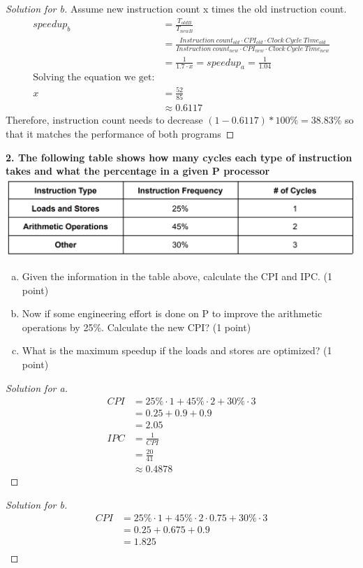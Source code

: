\documentclass[12pt]{article}
\begin{document}
\begin{proof}[Solution for b]
	Assume new instruction count x times the old instruction count.
	\begin{align*}
		speedup_b&=\frac{T_{oldB}}{T_{newB}}\\
		&=\frac{Instruction\ count_{old} \cdot CPI_{old} \cdot Clock\ Cycle\ Time_{old}}{Instruction\ count_{new} \cdot CPI_{new} \cdot Clock\ Cycle\ Time_{new}}\\
		&=\frac{1}{1.7\cdot x} = speedup_a = \frac{1}{1.04}\\
		\text{Solving the equation we get:}\\
		x&=\frac{52}{85}\\
		&\approx0.6117
	\end{align*}
Therefore, instruction count needs to decrease $(1-0.6117)*100\%=38.83$\% so that it matches the
performance of both programs
\end{proof}

\textbf{2. The following table shows how many cycles each type of instruction takes and what the
	percentage in a given P processor}\\
\includegraphics[scale=0.3]{1.png}

\begin{enumerate}[a)]
	\item Given the information in the table above, calculate the CPI and IPC. (1 point)
	\item Now if some engineering effort is done on P to improve the arithmetic operations by
	25\%. Calculate the new CPI? (1 point)
	\item What is the maximum speedup if the loads and stores are optimized? (1 point)
\end{enumerate}

\begin{proof}[Solution for a]
	\begin{align*}
		CPI&=25\%\cdot1+45\%\cdot2+30\%\cdot3\\
		&=0.25+0.9+0.9\\
		&=2.05\\
		IPC&=\frac{1}{CPI}\\
		&=\frac{20}{41}\\
		&\approx0.4878
	\end{align*}
\end{proof}
\begin{proof}[Solution for b]
	\begin{align*}
		CPI&=25\%\cdot1+45\%\cdot2\cdot0.75+30\%\cdot3\\
		&=0.25+0.675+0.9\\
		&=1.825\\
	\end{align*}
\end{proof}
\end{document}
